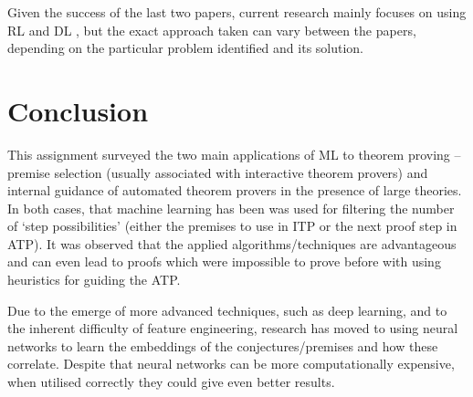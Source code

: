 \documentclass{article}
\begin{document}
Given the success of the last two papers, current research mainly focuses on
using RL and DL \citep{GuidingTPbyRNNs,TowardsLonger}, but the exact
approach taken can vary between the papers, depending on the particular problem
identified and its solution.

\section{Conclusion}\label{sec:conclusion}

This assignment surveyed the two main applications of ML to theorem proving --
premise selection (usually associated with interactive theorem provers) and
internal guidance of automated theorem provers in the presence of large
theories. In both cases, that machine learning has been was used for filtering
the number of `step possibilities' (either the premises to use in ITP or the
next proof step in ATP). It was observed that the applied algorithms/techniques
are advantageous and can even lead to proofs which were impossible to prove
before with using heuristics for guiding the ATP.

Due to the emerge of more advanced techniques, such as deep learning, and to
the inherent difficulty of feature engineering, research has moved to using
neural networks to learn the embeddings of the conjectures/premises and how
these correlate. Despite that neural networks can be more computationally
expensive, when utilised correctly they could give even better results.




\end{document}
